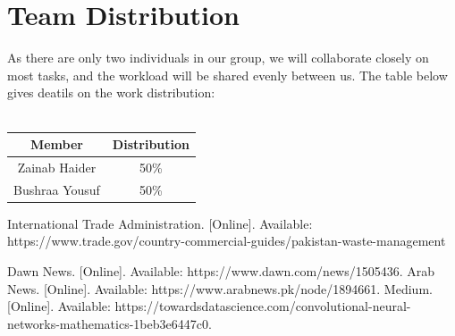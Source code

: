 \documentclass{article}
\begin{document}
\section{Team Distribution}
As there are only two individuals in our group, we will collaborate closely on most tasks, and the workload will be shared evenly between us. The table below gives deatils on the work distribution:\\ \\ 
    \centering
    \begin{tabular}{|c|c|}
        \hline
        Member & Distribution         \\ \hline
        Zainab Haider    & 50\%   \\ \hline
        Bushraa Yousuf    & 50\%  \\ \hline
    \end{tabular}
\begin{thebibliography}{9}
  International Trade Administration. \textit{} [Online]. Available: https://www.trade.gov/country-commercial-guides/pakistan-waste-management
  
  Dawn News. \textit{} [Online]. Available: https://www.dawn.com/news/1505436.
  Arab News. \textit{} [Online]. Available: https://www.arabnews.pk/node/1894661.
  Medium. \textit{} [Online]. Available: https://towardsdatascience.com/convolutional-neural-networks-mathematics-1beb3e6447c0.
 
    \end{thebibliography}
\end{document}
